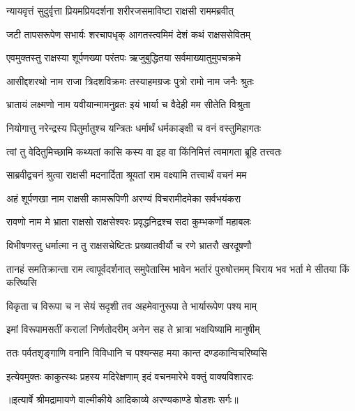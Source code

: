 \twolineshloka
{न्यायवृत्तं सुदुर्वृत्ता प्रियमप्रियदर्शना}
{शरीरजसमाविष्टा राक्षसी राममब्रवीत्} %

\twolineshloka
{जटी तापसरूपेण सभार्यः शरचापधृक्}
{आगतस्त्वमिमं देशं कथं राक्षससेवितम्} %

\twolineshloka
{एवमुक्तस्तु राक्षस्या शूर्पणख्या परंतपः}
{ऋजुबुद्धितया सर्वमाख्यातुमुपचक्रमे} %

\twolineshloka
{आसीद्दशरथो नाम राजा त्रिदशविक्रमः}
{तस्याहमग्रजः पुत्रो रामो नाम जनैः श्रुतः} %

\twolineshloka
{भ्रातायं लक्ष्मणो नाम यवीयान्मामनुव्रतः}
{इयं भार्या च वैदेही मम सीतेति विश्रुता} %

\twolineshloka
{नियोगात्तु नरेन्द्रस्य पितुर्मातुश्च यन्त्रितः}
{धर्मार्थं धर्मकाङ्क्षी च वनं वस्तुमिहागतः} %

\twolineshloka
{त्वां तु वेदितुमिच्छामि कथ्यतां कासि कस्य वा}
{इह वा किंनिमित्तं त्वमागता ब्रूहि तत्त्वतः} %

\twolineshloka
{साब्रवीद्वचनं श्रुत्वा राक्षसी मदनार्दिता}
{श्रूयतां राम वक्ष्यामि तत्त्वार्थं वचनं मम} %

\twolineshloka
{अहं शूर्पणखा नाम राक्षसी कामरूपिणी}
{अरण्यं विचरामीदमेका सर्वभयंकरा} %

\twolineshloka
{रावणो नाम मे भ्राता राक्षसो राक्षसेश्वरः}
{प्रवृद्धनिद्रश्च सदा कुम्भकर्णो महाबलः} %

\twolineshloka
{विभीषणस्तु धर्मात्मा न तु राक्षसचेष्टितः}
{प्रख्यातवीर्यौ च रणे भ्रातरौ खरदूषणौ} %

\threelineshloka
{तानहं समतिक्रान्ता राम त्वापूर्वदर्शनात्}
{समुपेतास्मि भावेन भर्तारं पुरुषोत्तमम्}
{चिराय भव भर्ता मे सीतया किं करिष्यसि} %

\twolineshloka
{विकृता च विरूपा च न सेयं सदृशी तव}
{अहमेवानुरूपा ते भार्यारूपेण पश्य माम्} %

\twolineshloka
{इमां विरूपामसतीं करालां निर्णतोदरीम्}
{अनेन सह ते भ्रात्रा भक्षयिष्यामि मानुषीम्} %

\twolineshloka
{ततः पर्वतशृङ्गाणि वनानि विविधानि च}
{पश्यन्सह मया कान्त दण्डकान्विचरिष्यसि} %

\twolineshloka
{इत्येवमुक्तः काकुत्स्थः प्रहस्य मदिरेक्षणाम्}
{इदं वचनमारेभे वक्तुं वाक्यविशारदः} %


{॥इत्यार्षे श्रीमद्रामायणे वाल्मीकीये आदिकाव्ये अरण्यकाण्डे षोडशः सर्गः॥}


